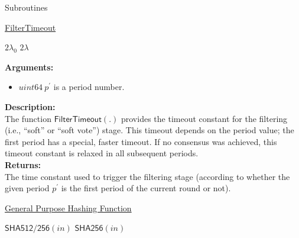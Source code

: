 \documentclass[10pt,a4paper]{article}
\begin{document}
\begin{section}{Subroutines}\label{sect:soubroutines}


\begin{algorithm}[H]
    \caption{\underline{FilterTimeout}}
    \label{algo:filter-timeout}
    \begin{algorithmic}[1]
            \State \Return $2\lambda_0$
        \Else 
            \State \Return $2\lambda$
        \EndIf
    \EndFunction
    \end{algorithmic}
\end{algorithm}

\noindent \textbf{Arguments:}
\begin{itemize}
    \item $uint64 \ p^\prime$ is a period number.
  \end{itemize}

\noindent \textbf{Description:}\\
The function $\mathsf{FilterTimeout}(.)$ provides the timeout 
constant for the filtering (i.e., ``soft'' or ``soft vote'') stage.
This timeout depends on the period value; the first period has a special, faster timeout.
If no consensus was achieved, this timeout constant is relaxed in all subsequent periods.\\ 

\noindent \textbf{Returns:}\\
The time constant used to trigger the filtering stage (according to whether the given
    period $p^\prime$ is the first period of the current round or not).


\begin{algorithm}[H]
    \caption{\underline{General Purpose Hashing Function}}
    \begin{algorithmic}[1]
            \State \Return $\mathsf{SHA512/256}(in)$
        \Else
            \State \Return $\mathsf{SHA256}(in)$
        \EndIf
    \EndFunction
    \end{algorithmic}
\end{algorithm}


\end{section}
\end{document}
